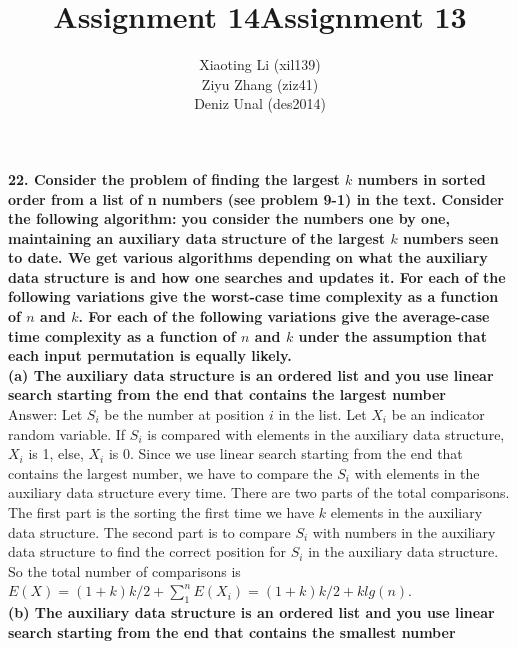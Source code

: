 \documentclass{article}
\title{Assignment 14}
\title{Assignment 13}
\author{Xiaoting Li (xil139) \\
Ziyu Zhang (ziz41) \\
Deniz Unal (des2014)}
\date{}
\begin{document}
\maketitle

\noindent
\textbf{22. Consider the problem of finding the largest $k$ numbers in sorted order from a list of n numbers (see problem 9-1) in the text. Consider the following algorithm: you consider the numbers one by one, maintaining an auxiliary data structure of the largest $k$ numbers seen to date. We get various algorithms depending on what the auxiliary data structure is and how one searches and updates it. For each of the following variations give the worst-case time complexity as a function of $n$ and $k$. For each of the following variations give the average-case time complexity as a function of $n$ and $k$ under the assumption that each input permutation is equally likely.}\\ \newline
\textbf{(a) The auxiliary data structure is an ordered list and you use linear search starting from the end that contains the largest number} \\ \newline
Answer: Let $S_i$ be the number at position $i$ in the list. Let $X_i$ be an indicator random variable. If $S_i$ is compared with elements in the auxiliary data structure, $X_i$ is 1, else, $X_i$ is 0. Since we use linear search starting from the end that contains the largest number, we have to compare the $S_i$ with elements in the auxiliary data structure every time. There are two parts of the total comparisons. The first part is the sorting the first time we have $k$ elements in the auxiliary data structure. The second part is to compare $S_i$ with numbers in the auxiliary data structure to find the correct position for $S_i$ in the auxiliary data structure. So the total number of comparisons is $E(X) = (1+k)k/2 + \sum_{1}^{n}E(X_i) = (1+k)k/2 + klg(n)$.\\ \newline
\textbf{(b) The auxiliary data structure is an ordered list and you use linear search starting from the end that contains the smallest number} \\ \newline
\end{document}
